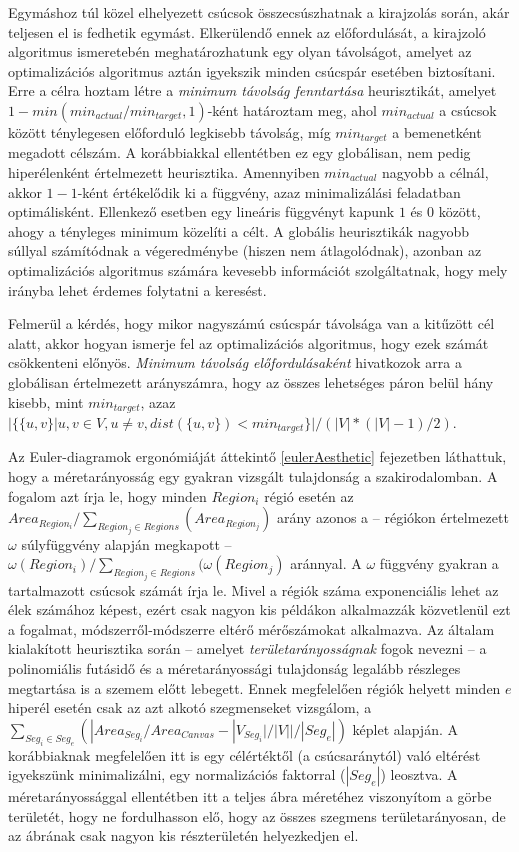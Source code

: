 Egymáshoz túl közel elhelyezett csúcsok összecsúszhatnak a kirajzolás során, akár teljesen el is fedhetik egymást. Elkerülendő ennek az előfordulását, a kirajzoló algoritmus ismeretebén meghatározhatunk egy olyan távolságot, amelyet az optimalizációs algoritmus aztán igyekszik minden csúcspár esetében biztosítani. Erre a célra hoztam létre a \textit{minimum távolság fenntartása} heurisztikát, amelyet $1-min(min_{actual} / min_{target}, 1)$-ként határoztam meg, ahol $min_{actual}$ a csúcsok között ténylegesen előforduló legkisebb távolság, míg $min_{target}$ a bemenetként megadott célszám. A korábbiakkal ellentétben ez egy globálisan, nem pedig hiperélenként értelmezett heurisztika. Amennyiben $min_{actual}$ nagyobb a célnál, akkor $1-1$-ként értékelődik ki a függvény, azaz minimalizálási feladatban optimálisként. Ellenkező esetben egy lineáris függvényt kapunk $1$ és $0$ között, ahogy a tényleges minimum közelíti a célt. A globális heurisztikák nagyobb súllyal számítódnak a végeredménybe (hiszen nem átlagolódnak), azonban az optimalizációs algoritmus számára kevesebb információt szolgáltatnak, hogy mely irányba lehet érdemes folytatni a keresést.


Felmerül a kérdés, hogy mikor nagyszámú csúcspár távolsága van a kitűzött cél alatt, akkor hogyan ismerje fel az optimalizációs algoritmus, hogy ezek számát csökkenteni előnyös. \textit{Minimum távolság előfordulásaként} hivatkozok arra a globálisan értelmezett arányszámra, hogy az összes lehetséges páron belül hány kisebb, mint $min_{target}$, azaz $|\{\{u,v\} | u,v \in V, u \neq v, dist(\{u,v\}) < min_{target}\}| / (|V|*(|V|-1)/2)$.


Az Euler-diagramok ergonómiáját áttekintő \ref{eulerAesthetic} fejezetben láthattuk, hogy a méretarányosság egy gyakran vizsgált tulajdonság a szakirodalomban. A fogalom azt írja le, hogy minden $Region_i$ régió esetén az $Area_{Region_i} / \sum_{Region_j \in Regions}(Area_{Region_j})$ arány azonos a -- régiókon értelmezett $\omega$ súlyfüggvény alapján megkapott -- $\omega(Region_i) / \sum_{Region_j \in Regions}(\omega(Region_j)$ aránnyal. A $\omega$ függvény gyakran a tartalmazott csúcsok számát írja le. Mivel a régiók száma exponenciális lehet az élek számához képest, ezért csak nagyon kis példákon alkalmazzák közvetlenül ezt a fogalmat, módszerről-módszerre eltérő mérőszámokat alkalmazva. Az általam kialakított heurisztika során -- amelyet \textit{területarányosságnak} fogok nevezni -- a polinomiális futásidő és a méretarányossági tulajdonság legalább részleges megtartása is a szemem előtt lebegett. Ennek megfelelően régiók helyett minden $e$ hiperél esetén csak az azt alkotó szegmenseket vizsgálom, a $\sum_{Seg_i \in Seg_e} (|Area_{Seg_i} / Area_{Canvas} - |V_{Seg_i}| / |V|| / |Seg_e|)$ képlet alapján. A korábbiaknak megfelelően itt is egy célértéktől (a csúcsaránytól) való eltérést igyekszünk minimalizálni, egy normalizációs faktorral ($|Seg_e|$) leosztva. A méretarányossággal ellentétben itt a teljes ábra méretéhez viszonyítom a görbe területét, hogy ne fordulhasson elő, hogy az összes szegmens területarányosan, de az ábrának csak nagyon kis részterületén helyezkedjen el.


